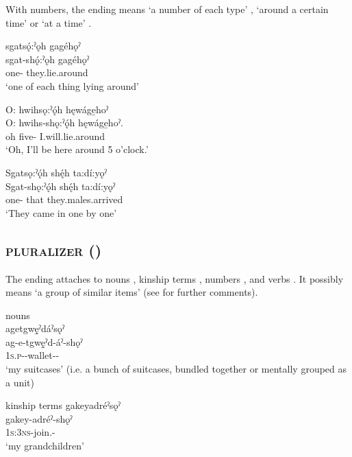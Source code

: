 \z
\z

With numbers, the  {\pluralizer} ending means ‘a number of each type’ , ‘around a certain time’  or ‘at a time’ .

\ea\label{ex:sooex4} sgatsǫ́:ˀǫh gagéhǫˀ\\
\gll sgat-shǫ́:ˀǫh gagéhǫˀ \\
one-{\pluralizer} they.lie.around\\
\glt ‘one of each thing lying around’
\z

\ea\label{ex:sooex45} O: hwihsǫ:ˀǫ́h hęwáge̱hoˀ\\
\gll O: hwihs-shǫ:ˀǫ́h hęwáge̱hoˀ. \\
oh five-{\pluralizer} I.will.lie.around\\
\glt ‘Oh, I’ll be here around 5 o’clock.’
\z

\ea\label{ex:sooex46} Sgatsǫ:ˀǫ́h shę́h ta:dí:yǫˀ\\
\gll Sgat-shǫ:ˀǫ́h shę́h ta:dí:yǫˀ \\
one-{\pluralizer} that they.males.arrived\\
\glt ‘They came in one by one’ 
\z 


\subsection{ \textsc{pluralizer} \textup{(}{\pluralizer}\textup{)}} \label{-sǫˀ}
The  \textsc{\pluralizer} ending attaches to nouns , kinship terms , numbers , and verbs . It possibly means ‘a group of similar items’ (see  for further comments).
 
\ea\label{ex:soex} nouns\\
agetgwę̱ˀdáˀsǫˀ \\
\gll ag-e-tgwę̱ˀd-áˀ-shǫˀ\\
\textsc{1s.p}-{\joinerE}-wallet-{\nsf}-{\pluralizer}\\
\glt ‘my suitcases’ (i.e. a bunch of suitcases, bundled together or mentally grouped as a unit)\\

\z


\ea\label{ex:soex2} kinship terms
\ea gakeyadréˀsǫˀ\\
\gll gakey-adréˀ-shǫˀ\\
 \textsc{1s:3ns}-join.{\stat}-{\pluralizer}\\
\glt `my grandchildren'

